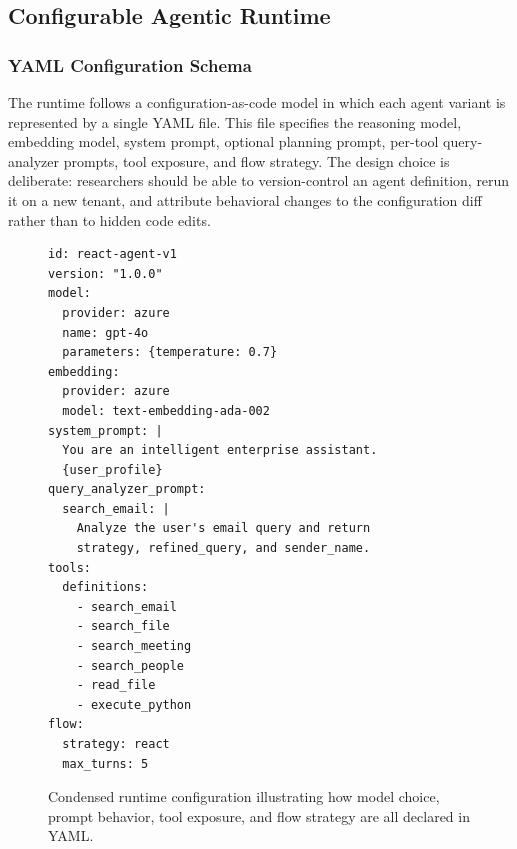 \subsection{Configurable Agentic Runtime}
\label{sec:method_runtime}

\subsubsection{YAML Configuration Schema}

The runtime follows a configuration-as-code model in which each agent variant is represented by a single YAML file. This file specifies the reasoning model, embedding model, system prompt, optional planning prompt, per-tool query-analyzer prompts, tool exposure, and flow strategy. The design choice is deliberate: researchers should be able to version-control an agent definition, rerun it on a new tenant, and attribute behavioral changes to the configuration diff rather than to hidden code edits.

\begin{figure}[t]
\centering
\begin{minipage}{0.92\linewidth}
\begin{lstlisting}[basicstyle=\color{blue}\small\ttfamily]
id: react-agent-v1
version: "1.0.0"
model:
  provider: azure
  name: gpt-4o
  parameters: {temperature: 0.7}
embedding:
  provider: azure
  model: text-embedding-ada-002
system_prompt: |
  You are an intelligent enterprise assistant.
  {user_profile}
query_analyzer_prompt:
  search_email: |
    Analyze the user's email query and return
    strategy, refined_query, and sender_name.
tools:
  definitions:
    - search_email
    - search_file
    - search_meeting
    - search_people
    - read_file
    - execute_python
flow:
  strategy: react
  max_turns: 5
\end{lstlisting}
\end{minipage}
\caption{Condensed runtime configuration illustrating how model choice, prompt behavior, tool exposure, and flow strategy are all declared in YAML.}
\label{lst:runtime_yaml}
\end{figure}

